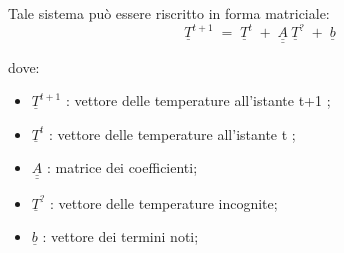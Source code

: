 \vspace{1.5cm}


\noindent
\hspace{2cm}  Tale sistema può essere riscritto in forma matriciale:\\
$$
\underline{T}^{t+1} \;=\; \underline{T}^{t} \;+\;  \underline{\underline{A}} \:  \underline{T}^{?} \;+\;  \underline{b} 
$$


\noindent
\hspace{1cm}  dove:
\begin{itemize}[label=·, topsep=0pt, partopsep=0pt, parsep=0pt, itemsep=0pt]
	\item \textit{$\underline{T}^{t+1}$} : vettore delle temperature all'istante t+1 ;
	\item \textit{$\underline{T}^{t}$} : vettore delle temperature all'istante t ;
	\item \textit{$\underline{\underline{A}}$} : matrice dei coefficienti;
	\item \textit{$\underline{T}^{?}$} : vettore delle temperature incognite;
	\item \textit{$\underline{b}$} : vettore dei termini noti;
\end{itemize}

\restoregeometry

\newpage



